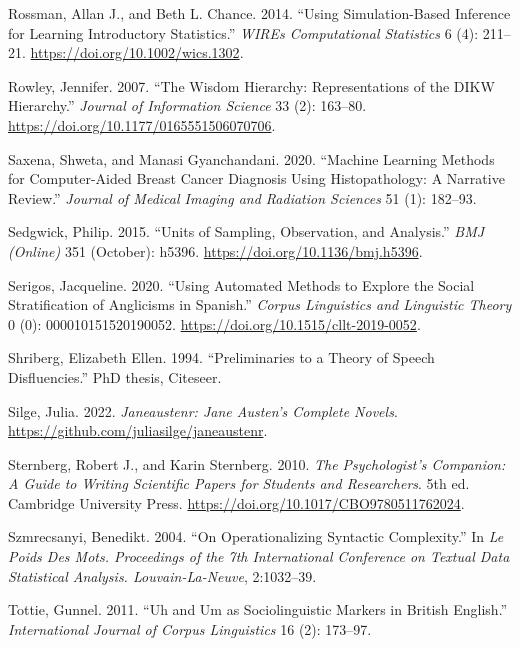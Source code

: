 \documentclass[
  letterpaper,
]{latex/krantz}
\newlength{\cslhangindent}
\newenvironment{CSLReferences}[2] %
 {\begin{list}{}{%
  \setlength{\itemindent}{0pt}
  \setlength{\leftmargin}{0pt}
  \setlength{\parsep}{0pt}
  \ifodd #1
   \setlength{\leftmargin}{\cslhangindent}
   \setlength{\itemindent}{-1\cslhangindent}
  \fi
  \setlength{\itemsep}{#2\baselineskip}}}
 {\end{list}}
\theoremstyle{definition}
\theoremstyle{remark}
\begin{document}
\begin{CSLReferences}{1}{0}
Rossman, Allan J., and Beth L. Chance. 2014. {``Using Simulation-Based
Inference for Learning Introductory Statistics.''} \emph{WIREs
Computational Statistics} 6 (4): 211--21.
\url{https://doi.org/10.1002/wics.1302}.

Rowley, Jennifer. 2007. {``The Wisdom Hierarchy: Representations of the
DIKW Hierarchy.''} \emph{Journal of Information Science} 33 (2):
163--80. \url{https://doi.org/10.1177/0165551506070706}.

Saxena, Shweta, and Manasi Gyanchandani. 2020. {``Machine Learning
Methods for Computer-Aided Breast Cancer Diagnosis Using Histopathology:
A Narrative Review.''} \emph{Journal of Medical Imaging and Radiation
Sciences} 51 (1): 182--93.

Sedgwick, Philip. 2015. {``Units of Sampling, Observation, and
Analysis.''} \emph{BMJ (Online)} 351 (October): h5396.
\url{https://doi.org/10.1136/bmj.h5396}.

Serigos, Jacqueline. 2020. {``Using Automated Methods to Explore the
Social Stratification of Anglicisms in Spanish.''} \emph{Corpus
Linguistics and Linguistic Theory} 0 (0): 000010151520190052.
\url{https://doi.org/10.1515/cllt-2019-0052}.

Shriberg, Elizabeth Ellen. 1994. {``Preliminaries to a Theory of Speech
Disfluencies.''} PhD thesis, Citeseer.

Silge, Julia. 2022. \emph{Janeaustenr: Jane Austen's Complete Novels}.
\url{https://github.com/juliasilge/janeaustenr}.

Sternberg, Robert J., and Karin Sternberg. 2010. \emph{The
Psychologist's Companion: A Guide to Writing Scientific Papers for
Students and Researchers}. 5th ed. Cambridge University Press.
\url{https://doi.org/10.1017/CBO9780511762024}.

Szmrecsanyi, Benedikt. 2004. {``On Operationalizing Syntactic
Complexity.''} In \emph{Le Poids Des Mots. Proceedings of the 7th
International Conference on Textual Data Statistical Analysis.
Louvain-La-Neuve}, 2:1032--39.

Tottie, Gunnel. 2011. {``Uh and Um as Sociolinguistic Markers in British
English.''} \emph{International Journal of Corpus Linguistics} 16 (2):
173--97.


\end{CSLReferences}
\end{document}
